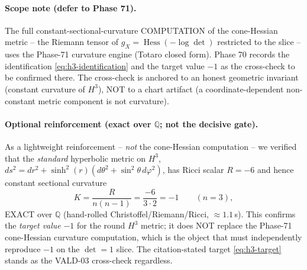 \paragraph{Scope note (defer to Phase 71).}
The full constant-sectional-curvature COMPUTATION of the cone-Hessian metric --
the Riemann tensor of $g_X = \operatorname{Hess}(-\log\det)$ restricted to the slice
-- uses the Phase-71 curvature engine (Totaro closed form). Phase 70 records the
identification \eqref{eq:h3-identification} and the target value $-1$ as the
cross-check to be confirmed there. The cross-check is anchored to an honest
geometric invariant (constant curvature of $H^3$), NOT to a chart artifact (a
coordinate-dependent non-constant metric component is not curvature).

\paragraph{Optional reinforcement (exact over $\mathbb{Q}$; not the decisive gate).}
As a lightweight reinforcement -- \emph{not} the cone-Hessian computation -- we
verified that the \emph{standard} hyperbolic metric on $H^3$,
$ds^2 = dr^2 + \sinh^2(r)(d\theta^2 + \sin^2\theta\,d\varphi^2)$, has Ricci scalar
$R = -6$ and hence constant sectional curvature
\begin{equation}
  K = \frac{R}{n(n-1)} = \frac{-6}{3 \cdot 2} = -1
  \qquad (n = 3),
  \label{eq:h3-reinforcement}
\end{equation}
EXACT over $\mathbb{Q}$ (hand-rolled Christoffel/Riemann/Ricci, $\approx 1.1$\,s).
This confirms the \emph{target value} $-1$ for the round $H^3$ metric; it does NOT
replace the Phase-71 cone-Hessian curvature computation, which is the object that
must independently reproduce $-1$ on the $\det = 1$ slice. The citation-stated
target \eqref{eq:h3-target} stands as the VALD-03 cross-check regardless.
